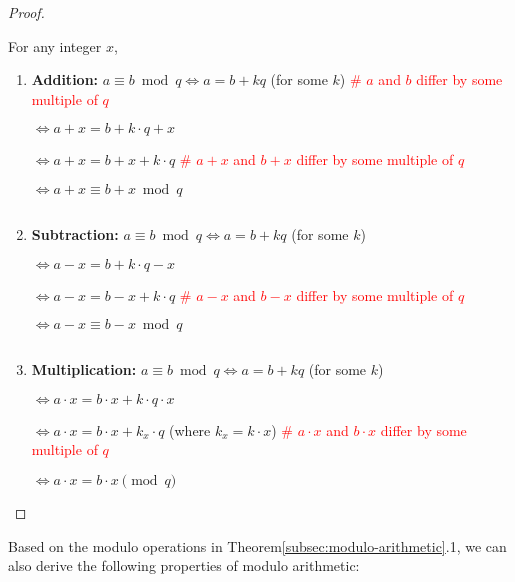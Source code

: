 \begin{proof}

$ $

For any integer $x$,

\begin{enumerate}


\item \textbf{Addition:} $a \equiv b \bmod q \Longleftrightarrow a = b + k q $ (for some $k$) \textcolor{red}{ \text{ } \# $a$ and $b$ differ by some multiple of $q$}

$\Longleftrightarrow a + x = b + k\cdot q + x$

$\Longleftrightarrow a + x = b + x + k\cdot q$ \textcolor{red}{ \text{ }  \# $a+x$ and $b+x$ differ by some multiple of $q$}

$\Longleftrightarrow a + x \equiv b + x \bmod q$

$ $

\item \textbf{Subtraction:} $a \equiv b \bmod q \Longleftrightarrow a = b + k q $ (for some $k$)

$\Longleftrightarrow a - x = b + k\cdot q - x$

$\Longleftrightarrow a - x = b - x + k\cdot q$  \textcolor{red}{ \text{ }  \# $a-x$ and $b-x$ differ by some multiple of $q$}

$\Longleftrightarrow a - x \equiv b - x \bmod q$

$ $

\item \textbf{Multiplication:} $a \equiv b \bmod q \Longleftrightarrow a = b + k q $ (for some $k$)

$\Longleftrightarrow a \cdot x = b \cdot x + k\cdot q \cdot x$

$\Longleftrightarrow a \cdot x = b \cdot x + k_x\cdot q$ (where $k_x = k \cdot x$)  \textcolor{red}{ \text{ }  \# $a\cdot x$ and $b\cdot x$ differ by some multiple of $q$}

$\Longleftrightarrow a \cdot x = b \cdot x \pmod q$

\end{enumerate}
\end{proof}

Based on the modulo operations in Theorem\ref*{subsec:modulo-arithmetic}.1, we can also derive the following properties of modulo arithmetic:


